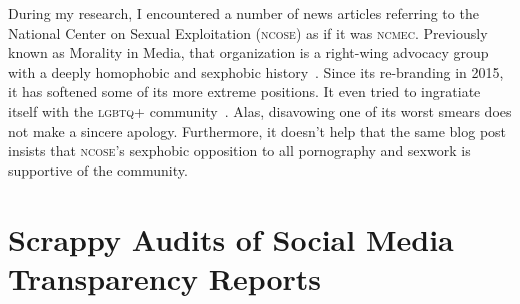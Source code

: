 \documentclass[nonacm,screen]{acmart}
\newcommand\V[1]{\textsc{\MakeLowercase{#1}}}
\begin{document}
During my research, I encountered a number of news articles referring to the
National Center on Sexual Exploitation (\V{NCOSE}) as if it was \V{NCMEC}.
Previously known as Morality in Media, that organization is a right-wing
advocacy group with a deeply homophobic and sexphobic
history~\cite{WikipediaNCOSE}. Since its re-branding in 2015, it has softened
some of its more extreme positions. It even tried to ingratiate itself with the
\V{LGBTQ+} community~\cite{Hawkins2023a}. Alas, disavowing one of its worst
smears does not make a sincere apology. Furthermore, it doesn't help that the
same blog post insists that \V{NCOSE}'s sexphobic opposition to all pornography
and sexwork is supportive of the community.



\section{Scrappy Audits of Social Media Transparency Reports}
\label{sec:audits}
\end{document}
